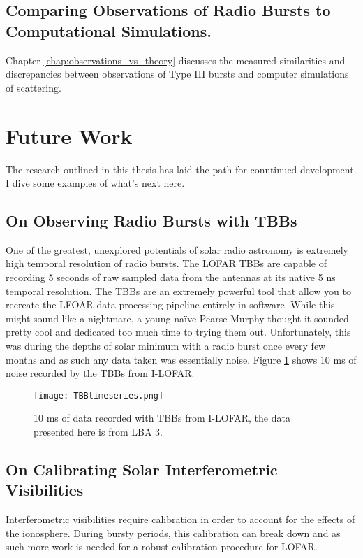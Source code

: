\subsection{Comparing Observations of Radio Bursts to Computational Simulations.}
Chapter \ref{chap:observations_vs_theory} discusses the measured similarities and discrepancies between observations of Type III bursts and computer simulations of scattering.
\section{Future Work}
The research outlined in this thesis has laid the path for conntinued development. I dive some examples of what's next here.
\subsection{On Observing Radio Bursts with TBBs}
One of the greatest, unexplored potentials of solar radio astronomy is extremely high temporal resolution of radio bursts. The LOFAR TBBs are capable of recording 5 seconds of raw sampled data from the antennas at its native 5 ns temporal resolution. The TBBs are an extremely powerful tool that allow you to recreate the LFOAR data processing pipeline entirely in software. While this might sound like a nightmare, a young na\"ive Pearse Murphy thought it sounded pretty cool and dedicated too much time to trying them out. Unfortunately, this was during the depths of solar minimum with a radio burst once every few months and as such any data taken was essentially noise. Figure \ref{fig:TBB_timeseries} shows 10 ms of noise recorded by the TBBs from I-LOFAR.
%
\begin{figure}[ht]
\centering
\texttt{[image: TBBtimeseries.png]}
\caption[10 ms of data recorded with TBBs from I-LOFAR.]{10 ms of data recorded with TBBs from I-LOFAR, the data presented here is from LBA 3.}
\label{fig:TBB_timeseries}
\end{figure}
\subsection{On Calibrating Solar Interferometric Visibilities}
Interferometric visibilities require calibration in order to account for the effects of the ionosphere. During bursty periods, this calibration can break down and as such more work is needed for a robust calibration procedure for LOFAR.
